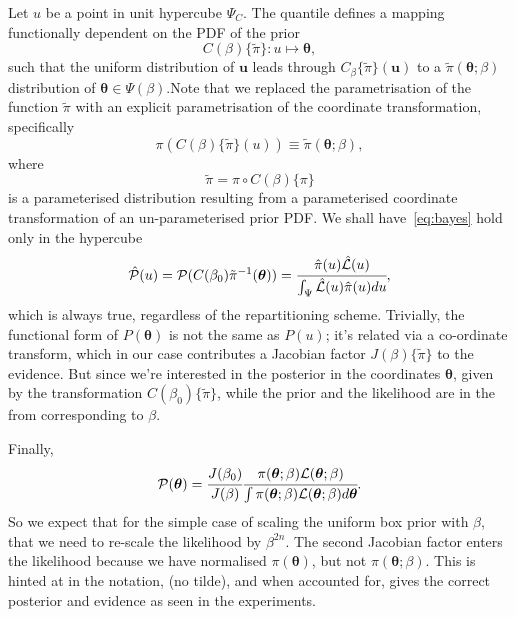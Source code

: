 \documentclass[usenatbib]{mnras}
\begin{document}
Let \(u\) be a point in unit hypercube \(\Psi_{C}\). The quantile
defines a mapping functionally dependent on the PDF of the prior
\[C(\beta)\lbrace \tilde{\pi}\rbrace:u \mapsto \bm{\theta},\] such that
the uniform distribution of \(\bm{u}\) leads through
\(C_{\beta}\{\tilde{\pi}\}(\bm{u})\) to a \(\tilde{\pi}(\bm{\theta};\beta)\)
distribution of \(\bm{\theta} \in\Psi(\beta)\).Note that we replaced the
parametrisation of the function \(\tilde{\pi}\) with an explicit
parametrisation of the coordinate transformation, specifically
\begin{equation}
  \pi(C(\beta)\{\tilde{\pi}\}(u)) \equiv \tilde{\pi}(\bm{\theta}; \beta),
\end{equation}
where 
\begin{equation}
  \tilde{\pi} =  \pi \circ C(\beta) \{ \pi \} 
\end{equation}
is a parameterised distribution resulting from a parameterised
coordinate transformation of an un-parameterised prior PDF. We shall
have~\vref{eq:bayes} hold only in the hypercube
\begin{equation}
{\cal \hat{P}}(u) = {\cal P}(C(\beta_{0}){\tilde{\pi}}^{-1}(\bm{\theta})) = \cfrac{\hat{\pi} (u) {\cal \hat{L}}(u)}{\int_{\Psi}{\cal \hat{L}}(u) \hat{\pi}(u) du},
\end{equation}
which is always true, regardless of the repartitioning
scheme. Trivially, the functional form of \(P(\bm{\theta})\) is not the same
as \(P(u)\); it's related via a co-ordinate transform, which in our
case contributes a Jacobian factor \(J(\beta)\{\tilde{\pi}\}\) to the
evidence. But since we're interested in the posterior in the
coordinates \(\bm{\theta}\), given by the transformation \(C(\beta_{0})\{\tilde{\pi}\}\),
while the prior and the likelihood are in the from corresponding
to \(\beta\).

Finally, 
\begin{equation}
 {\cal P}(\bm{\theta}) = \cfrac{J(\beta_{0})}{J(\beta)} \cfrac{\pi(\bm{\theta}; \beta) {\cal L}(\bm{\theta}; \beta)}{\int \pi(\bm{\theta}; \beta) {\cal L}(\bm{\theta}; \beta) d \bm{\theta}}.
\end{equation}
So we expect that for the simple case of scaling the uniform box
prior with \(\beta\), that we need to re-scale the likelihood by
\(\beta^{2n}\). The second Jacobian factor enters the likelihood because
we have normalised \(\pi(\bm{\theta})\), but not \(\pi(\bm{\theta}; \beta)\). This is hinted at in
the notation, (no tilde), and when accounted for, gives  the correct
posterior and evidence as seen in the experiments.
\end{document}

